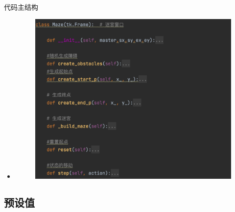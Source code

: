 \documentclass{beamer}
\begin{document}
\begin{frame}{代码主结构}
    \begin{itemize}
    \tiny
    \item 
    \begin{minipage}{1\linewidth}
        \medskip
        \begin{figure}[h]
            \centering
            \includegraphics[height=.8\textheight]{pic/11.png}
        \end{figure}
    \end{minipage}
    \end{itemize}
\end{frame}


\subsection{预设值}
\end{document}
